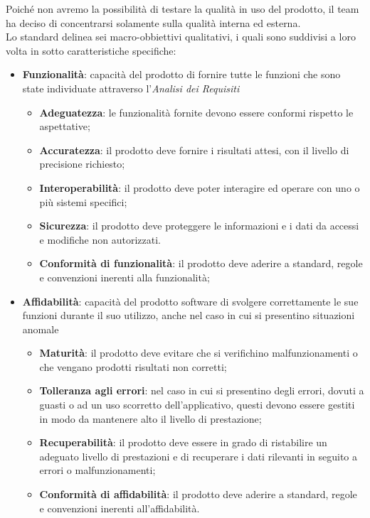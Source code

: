 Poiché non avremo la possibilità di testare la qualità in uso del prodotto, il team ha deciso di concentrarsi solamente sulla qualità interna ed esterna. \\ Lo standard delinea sei macro-obbiettivi qualitativi, i quali sono suddivisi a loro volta in sotto caratteristiche specifiche:
\begin{itemize}
\item\textbf{Funzionalità}: capacità del prodotto di fornire tutte le funzioni che sono state individuate attraverso l'\textit{Analisi dei Requisiti}
\begin{itemize}
\item\textbf{Adeguatezza}: le funzionalità fornite devono essere conformi rispetto le aspettative;
\item\textbf{Accuratezza}: il prodotto deve fornire i risultati attesi, con il livello di precisione richiesto;
\item\textbf{Interoperabilità}: il prodotto deve poter interagire ed operare con uno o più sistemi specifici;
\item\textbf{Sicurezza}: il prodotto deve proteggere le informazioni e i dati da accessi e modifiche non autorizzati.
\item\textbf{Conformità di funzionalità}: il prodotto deve aderire a standard, regole e convenzioni inerenti alla funzionalità;
\end{itemize}
\item\textbf{Affidabilità}: capacità del prodotto software di svolgere correttamente le sue funzioni durante il suo utilizzo, anche nel caso in cui si presentino situazioni anomale
\begin{itemize}
\item\textbf{Maturità}: il prodotto deve evitare che si verifichino malfunzionamenti o che vengano prodotti risultati non corretti;
\item\textbf{Tolleranza agli errori}: nel caso in cui si presentino degli errori, dovuti a guasti o ad un uso scorretto dell'applicativo, questi devono essere gestiti in modo da mantenere alto il livello di prestazione;
\item\textbf{Recuperabilità}: il prodotto deve essere in grado di ristabilire un
adeguato livello di prestazioni e di recuperare i dati rilevanti in seguito a errori o malfunzionamenti;
\item\textbf{Conformità di affidabilità}: il prodotto deve aderire a standard, regole e convenzioni inerenti all'affidabilità.
\end{itemize}

\end{itemize}
